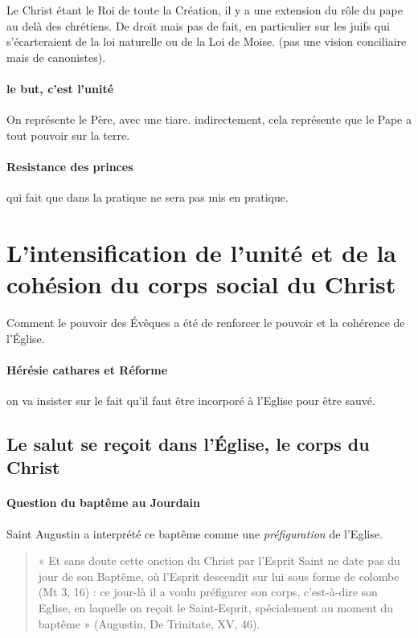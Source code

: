  
Le Christ étant le Roi de toute la Création, il y a une extension du rôle du pape au delà des chrétiens. De droit mais pas de fait, en particulier sur les juifs qui s'écarteraient de la loi naturelle ou de la Loi de Moise. (pas une vision conciliaire mais de canonistes).
\paragraph{le but, c'est l'unité} On représente le Père, avec une tiare. indirectement, cela représente que le Pape a tout pouvoir sur la terre.

\paragraph{Resistance des princes} qui fait que dans la pratique ne sera pas mis en pratique.

\section{L’intensification de l’unité et de la cohésion du corps social du Christ} 

Comment le pouvoir des Évêques a été de renforcer le pouvoir et la cohérence de l'Église.

\paragraph{Hérésie cathares et Réforme} on va insister sur le fait qu'il faut être incorporé à l'Eglise pour être sauvé. 

\subsection{Le salut se reçoit dans l’Église, le corps du Christ }

\paragraph{Question du baptême au Jourdain} Saint Augustin a interprété ce baptême comme une \textit{préfiguration} de l'Eglise. 
\begin{quote}
    « Et sans doute cette onction du Christ par l’Esprit Saint ne date pas du jour de son Baptême,
où l’Esprit descendit sur lui sous forme de colombe (Mt 3, 16) : ce jour-là il a voulu
préfigurer son corps, c’est-à-dire son Eglise, en laquelle on reçoit le Saint-Esprit,
spécialement au moment du baptême » (Augustin, De Trinitate, XV, 46).
\end{quote}


